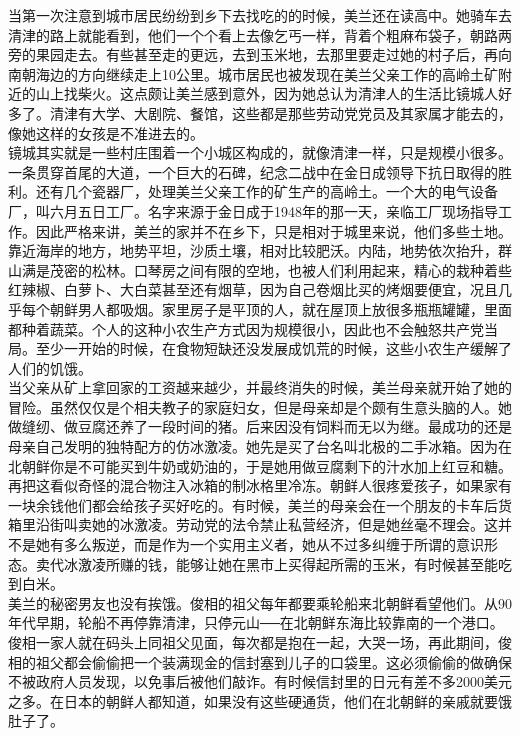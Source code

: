 \ifnum{}
	\begin{multicols}{\theparacolNo}
\fi
当第一次注意到城市居民纷纷到乡下去找吃的的时候，美兰还在读高中。她骑车去清津的路上就能看到，他们一个个看上去像乞丐一样，背着个粗麻布袋子，朝路两旁的果园走去。有些甚至走的更远，去到玉米地，去那里要走过她的村子后，再向南朝海边的方向继续走上10公里。城市居民也被发现在美兰父亲工作的高岭土矿附近的山上找柴火。这点颇让美兰感到意外，因为她总认为清津人的生活比镜城人好多了。清津有大学、大剧院、餐馆，这些都是那些劳动党党员及其家属才能去的，像她这样的女孩是不准进去的。\\

镜城其实就是一些村庄围着一个小城区构成的，就像清津一样，只是规模小很多。一条贯穿首尾的大道，一个巨大的石碑，纪念二战中在金日成领导下抗日取得的胜利。还有几个瓷器厂，处理美兰父亲工作的矿生产的高岭土。一个大的电气设备厂，叫六月五日工厂。名字来源于金日成于1948年的那一天，亲临工厂现场指导工作。因此严格来讲，美兰的家并不在乡下，只是相对于城里来说，他们多些土地。靠近海岸的地方，地势平坦，沙质土壤，相对比较肥沃。内陆，地势依次抬升，群山满是茂密的松林。口琴房之间有限的空地，也被人们利用起来，精心的栽种着些红辣椒、白萝卜、大白菜甚至还有烟草，因为自己卷烟比买的烤烟要便宜，况且几乎每个朝鲜男人都吸烟。家里房子是平顶的人，就在屋顶上放很多瓶瓶罐罐，里面都种着蔬菜。个人的这种小农生产方式因为规模很小，因此也不会触怒共产党当局。至少一开始的时候，在食物短缺还没发展成饥荒的时候，这些小农生产缓解了人们的饥饿。\\

当父亲从矿上拿回家的工资越来越少，并最终消失的时候，美兰母亲就开始了她的冒险。虽然仅仅是个相夫教子的家庭妇女，但是母亲却是个颇有生意头脑的人。她做缝纫、做豆腐还养了一段时间的猪。后来因没有饲料而无以为继。最成功的还是母亲自己发明的独特配方的仿冰激凌。她先是买了台名叫北极的二手冰箱。因为在北朝鲜你是不可能买到牛奶或奶油的，于是她用做豆腐剩下的汁水加上红豆和糖。再把这看似奇怪的混合物注入冰箱的制冰格里冷冻。朝鲜人很疼爱孩子，如果家有一块余钱他们都会给孩子买好吃的。有时候，美兰的母亲会在一个朋友的卡车后货箱里沿街叫卖她的冰激凌。劳动党的法令禁止私营经济，但是她丝毫不理会。这并不是她有多么叛逆，而是作为一个实用主义者，她从不过多纠缠于所谓的意识形态。卖代冰激凌所赚的钱，能够让她在黑市上买得起所需的玉米，有时候甚至能吃到白米。\\

美兰的秘密男友也没有挨饿。俊相的祖父每年都要乘轮船来北朝鲜看望他们。从90年代早期，轮船不再停靠清津，只停元山──在北朝鲜东海比较靠南的一个港口。俊相一家人就在码头上同祖父见面，每次都是抱在一起，大哭一场，再此期间，俊相的祖父都会偷偷把一个装满现金的信封塞到儿子的口袋里。这必须偷偷的做确保不被政府人员发现，以免事后被他们敲诈。有时候信封里的日元有差不多2000美元之多。在日本的朝鲜人都知道，如果没有这些硬通货，他们在北朝鲜的亲戚就要饿肚子了。\\


\end{multicols}
